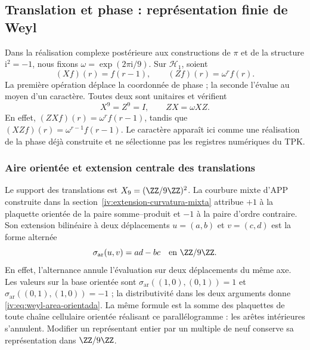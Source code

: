 

\subsection{Translation et phase : représentation finie de Weyl}

Dans la réalisation complexe postérieure aux constructions de \(\pi\) et de la structure \(\mathrm i^2=-1\), nous fixons \(\omega=\exp(2\pi\mathrm i/9)\). Sur \(\mathcal H_1\), soient
\begin{equation}
 (Xf)(r)=f(r-1),\qquad (Zf)(r)=\omega^r f(r).
 \label{iv:eq:weyl-operadores}
\end{equation}
La première opération déplace la coordonnée de phase ; la seconde
l’évalue au moyen d’un caractère. Toutes deux sont unitaires et vérifient
\begin{equation}
 X^9=Z^9=I,\qquad ZX=\omega XZ.
 \label{iv:eq:weyl-relacion}
\end{equation}
En effet, \((ZXf)(r)=\omega^r f(r-1)\), tandis que \((XZf)(r)=\omega^{r-1}f(r-1)\). Le caractère apparaît ici comme une réalisation de la phase déjà construite et ne sélectionne pas les registres numériques du TPK.

\subsubsection{Aire orientée et extension centrale des translations}
\label{iv:weyl-area-extension}

Le support des translations est \(X_9=(\ZZ/9\ZZ)^2\).
La courbure mixte d’APP construite dans la
section~\ref{iv:extension-curvatura-mixta} attribue \(+1\) à la
plaquette orientée de la paire somme--produit et \(-1\) à la
paire d’ordre contraire. Son extension bilinéaire à deux déplacements
\(u=(a,b)\) et \(v=(c,d)\) est la forme alternée
\begin{equation}
 \sigma_{\mathrm{ar}}(u,v)=ad-bc\quad\text{en }\ZZ/9\ZZ.
 \label{iv:eq:weyl-area-orientada}
\end{equation}
En effet, l’alternance annule l’évaluation sur deux déplacements
du même axe. Les valeurs sur la base orientée sont
\(\sigma_{\mathrm{ar}}((1,0),(0,1))=1\) et
\(\sigma_{\mathrm{ar}}((0,1),(1,0))=-1\) ; la distributivité dans les deux
arguments donne \eqref{iv:eq:weyl-area-orientada}. La même formule est
la somme des plaquettes de toute chaîne cellulaire orientée réalisant
ce parallélogramme : les arêtes intérieures s’annulent. Modifier un
représentant entier par un multiple de neuf conserve sa représentation
dans \(\ZZ/9\ZZ\).

